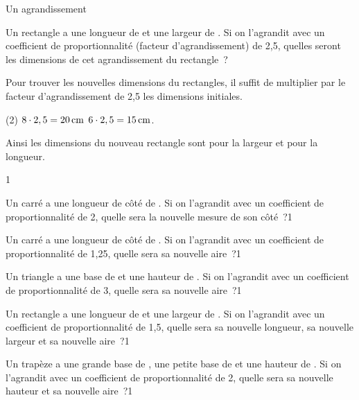 \documentclass[a4paper,11pt]{report}
\begin{document}


\begin{resolu}
	{Un agrandissement}{Un rectangle a une longueur de  et une largeur de . Si on l'agrandit avec un coefficient de proportionnalité (facteur d'agrandissement) de 2,5,  quelles seront les dimensions de cet agrandissement du rectangle~?

{\color{blue}
Pour trouver les nouvelles dimensions du rectangles, il suffit de multiplier par le facteur d'agrandissement de 2,5 les dimensions initiales.

\begin{tasks}(2)
	\task $8\cdot 2,5= \tunit{20}{cm}$
	\task $6\cdot 2,5=\tunit{15}{cm}$.
\end{tasks}


Ainsi les dimensions du nouveau rectangle sont  pour la largeur et  pour la longueur.
}
}{1}
\end{resolu}

\begin{exo} %
	{Un carré a une longueur de côté de . Si on l'agrandit avec un coefficient de proportionnalité de 2, quelle sera la nouvelle mesure de son côté~?}{1}
\end{exo}

\begin{exo} %
	{Un carré a une longueur de côté de . Si on l'agrandit avec un coefficient de proportionnalité de 1,25, quelle sera sa nouvelle aire~?}{1}
\end{exo}

\begin{exo} %
	{Un triangle a une base de  et une hauteur de . Si on l'agrandit avec un coefficient  de proportionnalité de 3, quelle sera sa nouvelle aire~?}{1}
\end{exo}

\begin{exo} %
	{Un rectangle a une longueur de  et une largeur de . Si on l'agrandit avec un coefficient de proportionnalité de 1,5, quelle sera sa nouvelle longueur, sa nouvelle largeur et sa nouvelle aire~?}{1}
\end{exo}

\begin{exo} %
	{Un trapèze a une grande base de , une petite base de  et une hauteur de . Si on l'agrandit avec un coefficient de proportionnalité de 2, quelle sera sa nouvelle hauteur et sa nouvelle aire~?}{1}
\end{exo}
\end{document}
